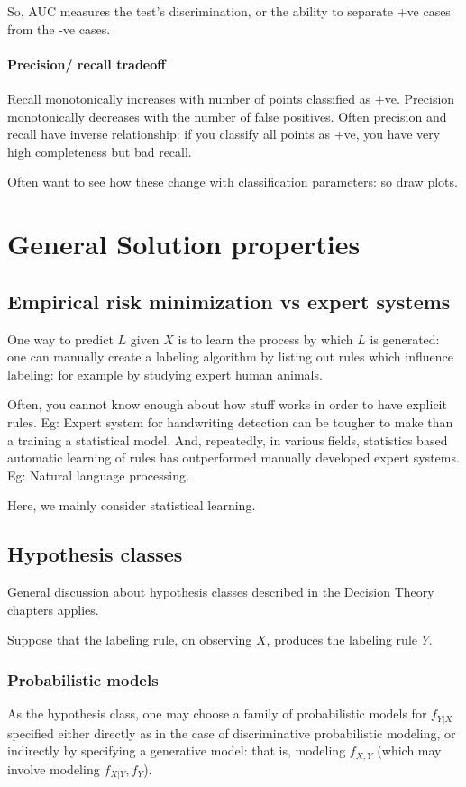 \documentclass[oneside, article]{memoir}
\begin{document}
So, AUC measures the test's discrimination, or the ability to separate +ve cases from the -ve cases.

\subsubsection{Precision/ recall tradeoff}
Recall monotonically increases with number of points classified as +ve. Precision monotonically decreases with the number of false positives. Often precision and recall have inverse relationship: if you classify all points as +ve, you have very high completeness but bad recall.

Often want to see how these change with classification parameters: so draw plots.


\chapter{General Solution properties}
\section{Empirical risk minimization vs expert systems}
One way to predict $L$ given $X$ is to learn the process by which $L$ is generated: one can manually create a labeling algorithm by listing out rules which influence labeling: for example by studying expert human animals.

Often, you cannot know enough about how stuff works in order to have explicit rules. Eg: Expert system for handwriting detection can be tougher to make than a training a statistical model. And, repeatedly, in various fields, statistics based automatic learning of rules has outperformed manually developed expert systems. Eg: Natural language processing.

Here, we mainly consider statistical learning.

\section{Hypothesis classes}
General discussion about hypothesis classes described in the Decision Theory chapters applies.

Suppose that the labeling rule, on observing $X$, produces the labeling rule $Y$.

\subsection{Probabilistic models}
As the hypothesis class, one may choose a family of probabilistic models for $f_{Y|X}$ specified either directly as in the case of discriminative probabilistic modeling, or indirectly by specifying a generative model: that is, modeling $f_{X,Y}$ (which may involve modeling $f_{X|Y}, f_Y$).
\end{document}

